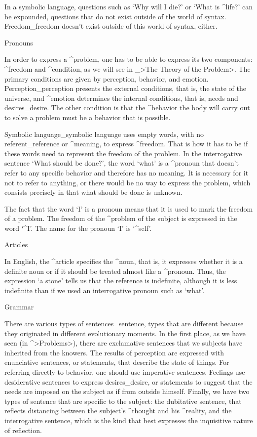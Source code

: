 In a symbolic language, questions such as `Why will I die?' or `What is
^{life}?' can be expounded, questions that do not exist outside of the
world of syntax. Freedom_{freedom} doesn't exist outside of this world
of syntax, either.


\Section Pronouns

In order to express a ^{problem}, one has to be able to express its two
components: ^{freedom} and ^{condition}, as we will see in _>The Theory
of the Problem>. The primary conditions are given by perception,
behavior, and emotion. Perception_{perception} presents the external
conditions, that is, the state of the universe, and ^{emotion}
determines the internal conditions, that is, needs and desires_{desire}.
The other condition is that the ^{behavior} the body will carry out to
solve a problem must be a behavior that is possible.

Symbolic language_{symbolic language} uses empty words, with no
referent_{reference} or ^{meaning}, to express ^{freedom}. That is how
it has to be if these words need to represent the freedom of the
problem. In the interrogative sentence `What should be done?', the word
`what' is a ^{pronoun} that doesn't refer to any specific behavior and
therefore has no meaning. It is necessary for it not to refer to
anything, or there would be no way to express the problem, which
consists precisely in that what should be done is unknown.

The fact that the word `I' is a pronoun means that it is used to mark
the freedom of a problem. The freedom of the ^{problem of the subject}
is expressed in the word `^{I}'. The name for the pronoun `I' is
`^{self}'.


\Section Articles

In English, the ^{article} specifies the ^{noun}, that is, it expresses
whether it is a definite noun or if it should be treated almost like a
^{pronoun}. Thus, the expression `a stone' tells us that the reference
is indefinite, although it is less indefinite than if we used an
interrogative pronoun such as `what'.


\Section Grammar

There are various types of sentences_{sentence, types} that are
different because they originated in different evolutionary moments. In
the first place, as we have seen (in ^>Problems>), there are exclamative
sentences that we subjects have inherited from the knowers. The results
of perception are expressed with enunciative sentences, or statements,
that describe the state of things. For referring directly to behavior,
one should use imperative sentences. Feelings use desiderative sentences
to express desires_{desire}, or statements to suggest that the needs are
imposed on the subject as if from outside himself. Finally, we have two
types of sentence that are specific to the subject: the dubitative
sentence, that reflects distancing between the subject's ^{thought} and
his ^{reality}, and the interrogative sentence, which is the kind that
best expresses the inquisitive nature of reflection.

